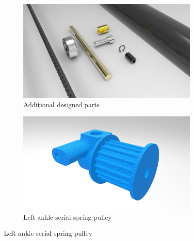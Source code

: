 \begin{figure}
    \begin{subfigure}[b]{0.49\textwidth}
        \includegraphics[width=\textwidth]{figures/legs_parts.jpg}
        \caption{Additional designed parts}
        \label{fig:mouse}
    \end{subfigure}
    \begin{subfigure}[b]{0.49\textwidth}
        \includegraphics[width=\textwidth]{figures/legs_pulley.jpg}
        \caption{Left ankle serial spring pulley}
        \label{fig:serial_spring_pulley}
    \end{subfigure}


\end{figure}
